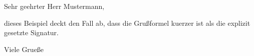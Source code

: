 \documentclass[basic]{../../onlinebrief24}
\begin{document}
\begin{letter}{}

\opening{Sehr geehrter Herr Mustermann,}

dieses Beispiel deckt den Fall ab, dass die Gru\ss{}formel kuerzer ist als die
explizit gesetzte Signatur.

\closing{Viele Grue\ss{}e}

\end{letter}
\end{document}
